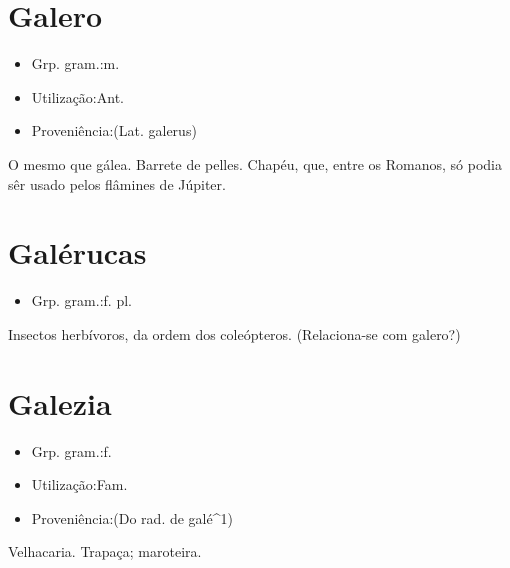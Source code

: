 \section{Galero}
\begin{itemize}
\item {Grp. gram.:m.}
\end{itemize}
\begin{itemize}
\item {Utilização:Ant.}
\end{itemize}
\begin{itemize}
\item {Proveniência:(Lat. \textunderscore galerus\textunderscore )}
\end{itemize}
O mesmo que \textunderscore gálea\textunderscore .
Barrete de pelles.
Chapéu, que, entre os Romanos, só podia sêr usado pelos flâmines de Júpiter.
\section{Galérucas}
\begin{itemize}
\item {Grp. gram.:f. pl.}
\end{itemize}
Insectos herbívoros, da ordem dos coleópteros.
(Relaciona-se com \textunderscore galero\textunderscore ?)
\section{Galezia}
\begin{itemize}
\item {Grp. gram.:f.}
\end{itemize}
\begin{itemize}
\item {Utilização:Fam.}
\end{itemize}
\begin{itemize}
\item {Proveniência:(Do rad. de \textunderscore galé\textunderscore ^1)}
\end{itemize}
Velhacaria.
Trapaça; maroteira.
